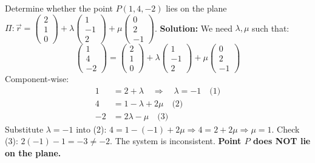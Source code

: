 \documentclass[11pt]{article}
\begin{document}
\begin{exoresolu}
Determine whether the point $P(1, 4, -2)$ lies on the plane $\Pi: \vec{r} = \begin{pmatrix} 2 \\ 1 \\ 0 \end{pmatrix} + \lambda \begin{pmatrix} 1 \\ -1 \\ 2 \end{pmatrix} + \mu \begin{pmatrix} 0 \\ 2 \\ -1 \end{pmatrix}$.
\tcblower
\textbf{Solution:}
We need $\lambda, \mu$ such that:
\[
\begin{pmatrix} 1 \\ 4 \\ -2 \end{pmatrix} = \begin{pmatrix} 2 \\ 1 \\ 0 \end{pmatrix} + \lambda \begin{pmatrix} 1 \\ -1 \\ 2 \end{pmatrix} + \mu \begin{pmatrix} 0 \\ 2 \\ -1 \end{pmatrix}
\]
Component-wise:
\begin{align*}
1 &= 2 + \lambda \quad \Rightarrow \quad \lambda = -1 \quad \text{(1)} \\
4 &= 1 - \lambda + 2\mu \quad \text{(2)} \\
-2 &= 2\lambda - \mu \quad \text{(3)}
\end{align*}
Substitute $\lambda = -1$ into (2): $4 = 1 - (-1) + 2\mu \Rightarrow 4 = 2 + 2\mu \Rightarrow \mu = 1$.
Check (3): $2(-1) - 1 = -3 \neq -2$.
The system is inconsistent. \textbf{Point $P$ does NOT lie on the plane.}
\end{exoresolu}
\end{document}
